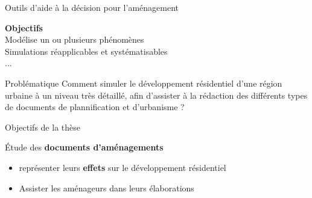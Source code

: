 \documentclass[xcolor=table]{beamer}
\begin{document}
\begin{frame}{Outils d'aide à la décision pour l'aménagement}
\begin{block}{}
	\textbf{Objectifs}\\
	Modélise un ou plusieurs phénomènes\\
	Simulations réapplicables et systématisables\\
	...
\end{block}
\end{frame}

\begin{frame}{Problématique}
Comment simuler le développement résidentiel d'une région urbaine à un niveau très détaillé, afin d'assister à la rédaction des différents types de documents de plannification et d'urbanisme ?
\end{frame}

\begin{frame}{Objectifs de la thèse}
	\begin{block}{}
	Étude des \textbf{documents d'aménagements}
		\begin{itemize}
			\item représenter leurs \textbf{effets} sur le développement résidentiel
			\item Assister les aménageurs dans leurs élaborations
		\end{itemize}
	\end{block}
\end{frame}
\end{document}
